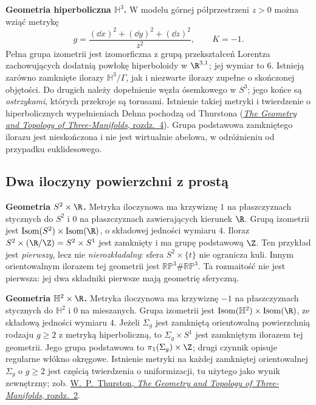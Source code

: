 \textbf{Geometria hiperboliczna $\mathbb H^3$.}
W modelu górnej półprzestrzeni $z>0$ można wziąć metrykę
\[
 g=\frac{(\dd x)^2+(\dd y)^2+(\dd z)^2}{z^2},\qquad K=-1.
\]
Pełna grupa izometrii jest izomorficzna z grupą przekształceń
Lorentza zachowujących dodatnią powłokę hiperboloidy
w $\R^{3,1}$; jej wymiar to $6$. Istnieją zarówno zamknięte
ilorazy $\mathbb H^3/\Gamma$, jak i niezwarte ilorazy zupełne
o skończonej objętości. Do drugich należy dopełnienie węzła
ósemkowego w $S^3$; jego końce są \emph{ostrzykami}, których
przekroje są torusami. Istnienie takiej metryki i twierdzenie
o hiperbolicznych wypełnieniach Dehna pochodzą od Thurstona
(\href{https://library.slmath.org/nonmsri/gt3m/PDF/Thurston-gt3m.pdf}
{\emph{The Geometry and Topology of Three-Manifolds}, rozdz.\ 4}).
Grupa podstawowa zamkniętego ilorazu jest nieskończona i nie jest
wirtualnie abelowa, w odróżnieniu od przypadku euklidesowego.

\subsection*{Dwa iloczyny powierzchni z prostą}

\textbf{Geometria $S^2\times\R$.}
Metryka iloczynowa ma krzywiznę $1$ na płaszczyznach stycznych
do $S^2$ i $0$ na płaszczyznach zawierających kierunek $\R$.
Grupą izometrii jest
$\operatorname{Isom}(S^2)\times\operatorname{Isom}(\R)$,
o składowej jedności wymiaru $4$.
Iloraz $S^2\times(\R/\Z)=S^2\times S^1$ jest zamknięty i ma
grupę podstawową $\Z$. Ten przykład jest \emph{pierwszy}, lecz
nie \emph{nierozkładalny}: sfera $S^2\times\{t\}$ nie ogranicza
kuli. Innym orientowalnym ilorazem tej geometrii jest
$\mathbb{RP}^3\#\mathbb{RP}^3$. Ta rozmaitość nie jest pierwsza:
jej dwa składniki pierwsze mają geometrię sferyczną.

\textbf{Geometria $\mathbb H^2\times\R$.}
Metryka iloczynowa ma krzywiznę $-1$ na płaszczyznach stycznych
do $\mathbb H^2$ i $0$ na mieszanych. Grupa izometrii jest
$\operatorname{Isom}(\mathbb H^2)\times\operatorname{Isom}(\R)$,
ze składową jedności wymiaru $4$.
Jeżeli $\Sigma_g$ jest zamkniętą orientowalną powierzchnią
rodzaju $g\geq2$ z metryką hiperboliczną, to
$\Sigma_g\times S^1$ jest zamkniętym ilorazem tej geometrii.
Jego grupa podstawowa to $\pi_1(\Sigma_g)\times\Z$;
drugi czynnik opisuje regularne włókno okręgowe.
Istnienie metryki na każdej zamkniętej orientowalnej
$\Sigma_g$ o $g\geq2$ jest częścią twierdzenia o uniformizacji,
tu użytego jako wynik zewnętrzny; zob.
\href{https://library.slmath.org/nonmsri/gt3m/PDF/Thurston-gt3m.pdf}
{W.\ P.\ Thurston, \emph{The Geometry and Topology of
Three-Manifolds}, rozdz.\ 2}.

